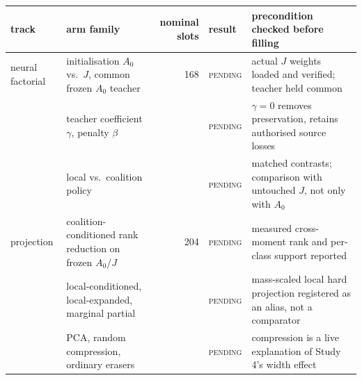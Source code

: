 \begin{tabular}{@{}l p{4.3cm} r l p{5.4cm}@{}}
\toprule
track & arm family & nominal slots & result & precondition checked before filling \\
\midrule
neural factorial & initialisation $A_0$ vs.\ $J$, common frozen $A_0$ teacher & 168 & \textsc{pending} & actual $J$ weights loaded and verified; teacher held common \\
 & teacher coefficient $\gamma$, penalty $\beta$ &  & \textsc{pending} & $\gamma=0$ removes preservation, retains authorised source losses \\
 & local vs.\ coalition policy &  & \textsc{pending} & matched contrasts; comparison with untouched $J$, not only with $A_0$ \\
projection & coalition-conditioned rank reduction on frozen $A_0$/$J$ & 204 & \textsc{pending} & measured cross-moment rank and per-class support reported \\
 & local-conditioned, local-expanded, marginal partial &  & \textsc{pending} & mass-scaled local hard projection registered as an alias, not a comparator \\
 & PCA, random compression, ordinary erasers &  & \textsc{pending} & compression is a live explanation of Study 4's width effect \\
\bottomrule
\end{tabular}
